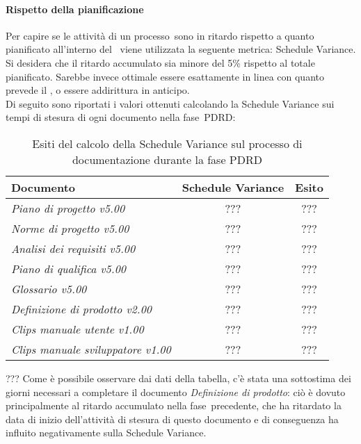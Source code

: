 \documentclass[../PianoDiQualifica.tex]{subfiles}
\begin{document}
\begin{appendices}
			\paragraph{Rispetto della pianificazione}
			Per capire se le attività di un processo\g\ sono in ritardo rispetto a quanto pianificato all'interno del \pianodiprogetto\ viene utilizzata la seguente metrica: Schedule Variance.\\
			Si desidera che il ritardo accumulato sia minore del 5\% rispetto al totale pianificato. Sarebbe invece ottimale essere esattamente in linea con quanto prevede il \pianodiprogetto, o essere addirittura in anticipo.\\
			Di seguito sono riportati i valori ottenuti calcolando la Schedule Variance sui tempi di stesura di ogni documento nella fase\g\ PDRD:
			\begin{table}[H]
				\centering
				\begin{tabular}{l * {2}{c}}
					\toprule
					\textbf{Documento} & \textbf{Schedule Variance} & \textbf{Esito} \\
					\midrule
					\textit{Piano di progetto v5.00} & ??? &  ??? \\
					\textit{Norme di progetto v5.00} & ??? & ??? \\
					\textit{Analisi dei requisiti v5.00} & ??? & ??? \\
					\textit{Piano di qualifica v5.00} & ??? & ??? \\
					\textit{Glossario v5.00} & ??? & ??? \\
					\textit{Definizione di prodotto v2.00} & ??? & ??? \\
					\textit{Clips manuale utente v1.00} & ??? & ??? \\
					\textit{Clips manuale sviluppatore v1.00} & ??? & ??? \\
					\bottomrule
				\end{tabular}
				\caption{Esiti del calcolo della Schedule Variance sul processo di documentazione durante la fase PDRD}
				\label{tab:esiti_schedule_variance}
			\end{table}
			
			??? Come è possibile osservare dai dati della tabella, c'è stata una sottostima dei giorni necessari a completare il documento \textit{Definizione di prodotto}: ciò è dovuto principalmente al ritardo accumulato nella fase\g\ precedente, che ha ritardato la data di inizio dell'attività di stesura di questo documento e di conseguenza ha influito negativamente sulla Schedule Variance.
			

\end{appendices}
\end{document}
